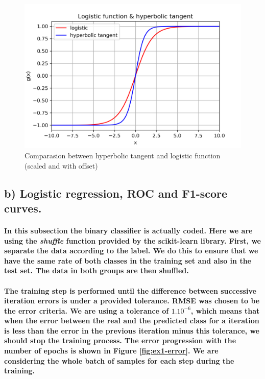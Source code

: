\documentclass[a4paper]{article}    %
\begin{document}
\begin{figure}[H]
    \centering
    \includegraphics[width=12cm]{logistic_vs_tanh}
    \caption{Comparasion between hyperbolic tangent and logistic function (scaled and with offset)}
    \label{fig:pre-ex1-logistic_tanh}
\end{figure}

\subsection{b) Logistic regression, ROC and F1-score curves.}

\paragraph{In this subsection the binary classifier is actually coded. Here we are using the \textit{shuffle} function provided by the scikit-learn library. First, we separate the data according to the label. We do this to ensure that we have the same rate of both classes in the training set and also in the test set. The data in both groups are then shuffled.}

\paragraph{The training step is performed until the difference between successive iteration errors is under a provided tolerance. RMSE was chosen to be the error criteria. We are using a tolerance of $1.10^{-6}$, which means that when the error between the real and the predicted class for a iteration is less than the error in the previous iteration minus this tolerance, we should stop the training process. The error progression with the number of epochs is shown in Figure \ref{fig:ex1-error}. We are considering the whole batch of samples for each step during the training.}
\end{document}
